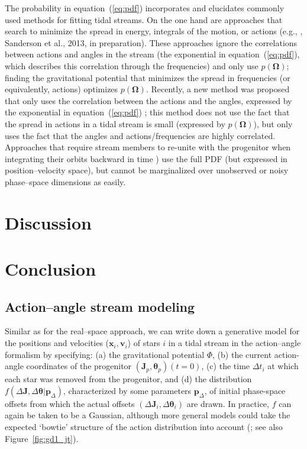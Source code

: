 \documentclass[12pt,preprint]{aastex}
\newcommand{\etal}{et al.}
\newcommand{\eg}{e.g.}
\newcommand{\eqnname}{equation}
\renewcommand{\figurename}{Figure}
\renewcommand{\vec}[1]{\ensuremath{\mathbf{#1}}}
\newcommand{\vecx}{\ensuremath{\vec{x}}}
\newcommand{\vecv}{\ensuremath{\vec{v}}}
\newcommand{\vecj}{\ensuremath{\vec{J}}}
\newcommand{\veco}{\ensuremath{\vec{\Omega}}}
\newcommand{\veca}{\ensuremath{\boldsymbol\theta}}
\newcommand{\paramsdiff}{\ensuremath{\vec{p}_\Delta}}
\begin{document}
The probability in \eqnname~(\ref{eq:pdf}) incorporates and elucidates
commonly used methods for fitting tidal streams. On the one hand are
approaches that search to minimize the spread in energy, integrals of
the motion, or actions (\eg, \citealt{Binney08a,Penarrubia12a},
Sanderson \etal, 2013, in preparation). These approaches ignore the
correlations between actions and angles in the stream (the exponential
in \eqnname~(\ref{eq:pdf}), which describes this correlation through
the frequencies) and only use $p(\veco)$; finding the gravitational
potential that minimizes the spread in frequencies (or equivalently,
actions) optimizes $p(\veco)$. Recently, a new method was proposed
that only uses the correlation between the actions and the angles,
expressed by the exponential in \eqnname~(\ref{eq:pdf})
\citep{Sanders13b}; this method does not use the fact that the spread
in actions in a tidal stream is small (expressed by $p(\veco)$), but
only uses the fact that the angles and actions/frequencies are highly
correlated. Approaches that require stream members to re-unite with
the progenitor when integrating their orbits backward in time
\citep{Johnston99a,PriceWhelan13a}) use the full PDF (but expressed in
position--velocity space), but cannot be marginalized over unobserved
or noisy phase--space dimensions as easily.



\section{Discussion}\label{sec:discussion}

\section{Conclusion}\label{sec:conclusion}



\subsection{Action--angle stream modeling}

Similar as for the real--space approach, we can write down a
generative model for the positions and velocities ($\vecx_i,\vecv_i$)
of stars $i$ in a tidal stream in the action--angle formalism by
specifying: (a) the gravitational potential $\Phi$, (b) the current
action-angle coordinates of the progenitor $(\vecj_p,\veca_p)(t=0)$,
(c) the time $\Delta t_i$ at which each star was removed from the
progenitor, and (d) the distribution $f(\Delta \vecj,\Delta
\veca|\paramsdiff)$, characterized by some parameters $\paramsdiff$,
of initial phase-space offsets from which the actual offsets $(\Delta
\vecj_i,\Delta \veca_i)$ are drawn. In practice, $f$ can again be
taken to be a Gaussian, although more general models could take the
expected `bowtie' structure of the action distribution into account
(\citealt{Eyre11a}; see also \figurename~\ref{fig:gd1_jt}).
\end{document}
